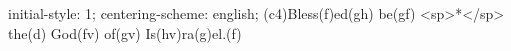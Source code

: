 initial-style: 1;
centering-scheme: english;
(c4)Bless(f)ed(gh) be(gf) <sp>*</sp> the(d) God(fv) of(gv) Is(hv)ra(g)el.(f)
